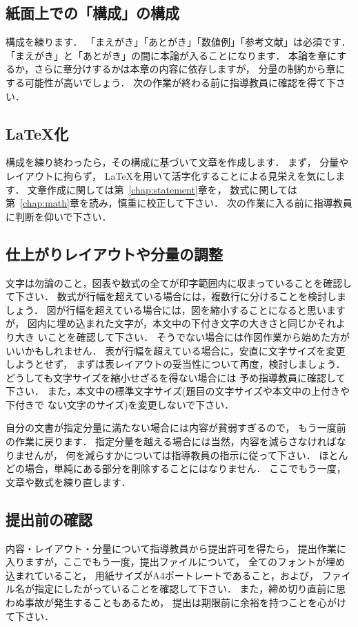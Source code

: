 \documentclass[a4j,12pt,dvipdfmx,oneside]{jsbook}
\theoremstyle{definition}
\begin{document}
\subsection{紙面上での「構成」の構成}
構成を練ります．
「まえがき」「あとがき」「数値例」「参考文献」は必須です．
「まえがき」と「あとがき」の間に本論が入ることになります．
本論を章にするか，さらに章分けするかは本章の内容に依存しますが，
分量の制約から章にする可能性が高いでしょう．
次の作業が終わる前に指導教員に確認を得て下さい．
%
%
%
\subsection{\LaTeX{}化}
構成を練り終わったら，その構成に基づいて文章を作成します．
まず，
分量やレイアウトに拘らず，
\LaTeX{}を用いて活字化することによる見栄えを気にします．
文章作成に関しては第~\ref{chap:statement}章を，
数式に関しては第~\ref{chap:math}章を読み，慎重に校正して下さい．
次の作業に入る前に指導教員に判断を仰いで下さい．
%
%
\subsection{仕上がりレイアウトや分量の調整}
文字は勿論のこと，図表や数式の全てが印字範囲内に収まっていることを確認し
て下さい．
数式が行幅を超えている場合には，複数行に分けることを検討しましょう．
図が行幅を超えている場合には，図を縮小することになると思いますが，
図内に埋め込まれた文字が，本文中の下付き文字の大きさと同じかそれより大き
いことを確認して下さい．
そうでない場合には作図作業から始めた方がいいかもしれません．
表が行幅を超えている場合に，安直に文字サイズを変更しようとせず，
まずは表レイアウトの妥当性について再度，検討しましょう．
どうしても文字サイズを縮小せざるを得ない場合には
予め指導教員に確認して下さい．
また，本文中の標準文字サイズ(題目の文字サイズや本文中の上付きや下付きで
ない文字のサイズ)を変更しないで下さい．

自分の文書が指定分量に満たない場合には内容が貧弱すぎるので，
もう一度前の作業に戻ります．
指定分量を越える場合には当然，内容を減らさなければなりませんが，
何を減らすかについては指導教員の指示に従って下さい．
ほとんどの場合，単純にある部分を削除することにはなりません．
ここでもう一度，文章や数式を練り直します．
%
%
%
\subsection{提出前の確認}
内容・レイアウト・分量について指導教員から提出許可を得たら，
提出作業に入りますが，ここでもう一度，提出ファイルについて，
全てのフォントが埋め込まれていること，
用紙サイズがA4ポートレートであること，および，
ファイル名が指定にしたがっていることを確認して下さい．
また，締め切り直前に思わぬ事故が発生することもあるため，
提出は期限前に余裕を持つことを心がけて下さい．
%
%
%
\end{document}
